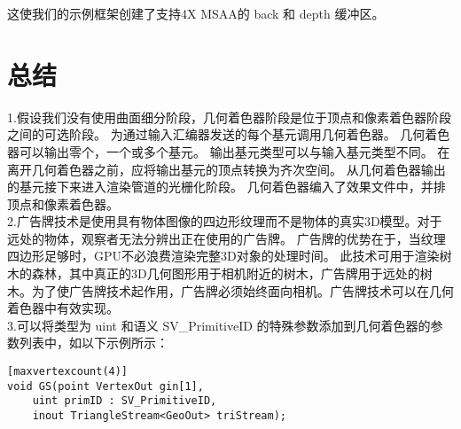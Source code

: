 \begin{flushleft}
这使我们的示例框架创建了支持4X MSAA的 back 和 depth 缓冲区。
\end{flushleft}

\section{总结}
\begin{flushleft}
1.假设我们没有使用曲面细分阶段，几何着色器阶段是位于顶点和像素着色器阶段之间的可选阶段。 为通过输入汇编器发送的每个基元调用几何着色器。 几何着色器可以输出零个，一个或多个基元。 输出基元类型可以与输入基元类型不同。 在离开几何着色器之前，应将输出基元的顶点转换为齐次空间。 从几何着色器输出的基元接下来进入渲染管道的光栅化阶段。 几何着色器编入了效果文件中，并排顶点和像素着色器。\\

2.广告牌技术是使用具有物体图像的四边形纹理而不是物体的真实3D模型。对于远处的物体，观察者无法分辨出正在使用的广告牌。 广告牌的优势在于，当纹理四边形足够时，GPU不必浪费渲染完整3D对象的处理时间。 此技术可用于渲染树木的森林，其中真正的3D几何图形用于相机附近的树木，广告牌用于远处的树木。为了使广告牌技术起作用，广告牌必须始终面向相机。广告牌技术可以在几何着色器中有效实现。\\

3.可以将类型为 uint 和语义 SV\_PrimitiveID 的特殊参数添加到几何着色器的参数列表中，如以下示例所示：\\
\end{flushleft}

\begin{lstlisting}
[maxvertexcount(4)]
void GS(point VertexOut gin[1],
    uint primID : SV_PrimitiveID,
    inout TriangleStream<GeoOut> triStream);
\end{lstlisting}

